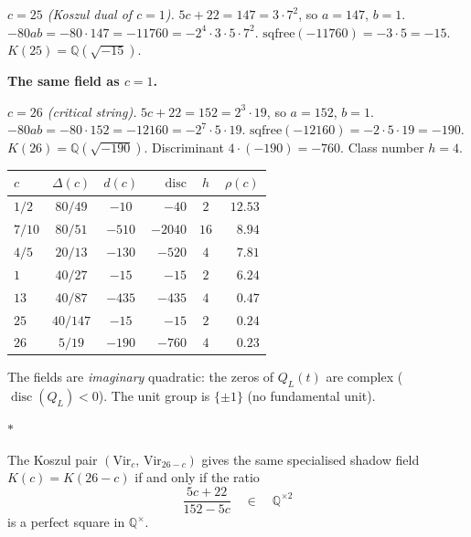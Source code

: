 \documentclass[11pt]{article}
\newcommand{\Q}{\mathbb{Q}}
\newcommand{\sep}{\bigskip\begin{center}$*$\end{center}\medskip}
\begin{document}
\medskip

\noindent\textit{$c = 25$ (Koszul dual of $c = 1$).}\enspace
$5c + 22 = 147 = 3 \cdot 7^2$, so $a = 147$, $b = 1$.
$-80ab = -80 \cdot 147 = -11760 = -2^4 \cdot 3 \cdot 5 \cdot 7^2$.
$\mathrm{sqfree}(-11760) = -3 \cdot 5 = -15$.
$K(25) = \Q(\sqrt{-15})$.

\textbf{The same field as $c = 1$.}

\medskip

\noindent\textit{$c = 26$ (critical string).}\enspace
$5c + 22 = 152 = 2^3 \cdot 19$, so $a = 152$, $b = 1$.
$-80ab = -80 \cdot 152 = -12160 = -2^7 \cdot 5 \cdot 19$.
$\mathrm{sqfree}(-12160) = -2 \cdot 5 \cdot 19 = -190$.
$K(26) = \Q(\sqrt{-190})$.
Discriminant $4 \cdot (-190) = -760$.
Class number $h = 4$.

\begin{center}
\small
\renewcommand{\arraystretch}{1.15}
\begin{tabular}{@{}lccrcr@{}}
$c$
  & $\Delta(c)$
  & $d(c)$
  & $\mathrm{disc}$
  & $h$
  & $\rho(c)$ \\
\hline
$1/2$ & $80/49$ & $-10$ & $-40$ & $2$
  & $12.53$ \\[2pt]
$7/10$ & $80/51$ & $-510$ & $-2040$ & $16$
  & $8.94$ \\[2pt]
$4/5$ & $20/13$ & $-130$ & $-520$ & $4$
  & $7.81$ \\[2pt]
$1$ & $40/27$ & $-15$ & $-15$ & $2$
  & $6.24$ \\[2pt]
$13$ & $40/87$ & $-435$ & $-435$ & $4$
  & $0.47$ \\[2pt]
$25$ & $40/147$ & $-15$ & $-15$ & $2$
  & $0.24$ \\[2pt]
$26$ & $5/19$ & $-190$ & $-760$ & $4$
  & $0.23$
\end{tabular}
\end{center}

\noindent
The fields are \emph{imaginary} quadratic: the zeros of
$Q_L(t)$ are complex ($\operatorname{disc}(Q_L) < 0$).
The unit group is $\{\pm 1\}$ (no fundamental unit).

\sep

\begin{proposition}
\label{prop:koszul-field-criterion}
The Koszul pair $(\mathrm{Vir}_c,\, \mathrm{Vir}_{26-c})$
gives the same specialised shadow field
$K(c) = K(26-c)$
if and only if the ratio
\begin{equation}\label{eq:koszul-field-ratio}
  \frac{5c + 22}{152 - 5c}
  \quad\in\quad \Q^{\times 2}
\end{equation}
is a perfect square in $\Q^\times$.
\end{proposition}
\end{document}
